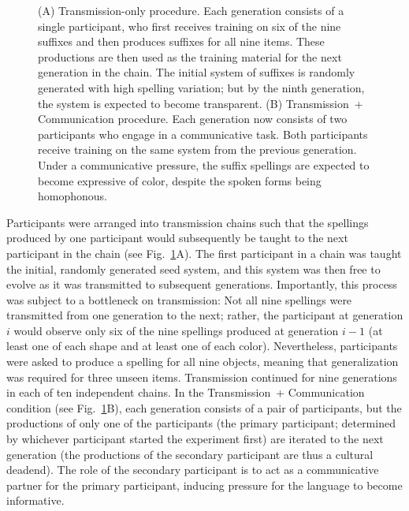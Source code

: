 \documentclass[doc,biblatex]{apa7}
\begin{document}
	\begin{figure}
	\vspace*{2pt}
	\caption{(A) Transmission-only procedure. Each generation consists of a single participant, who first receives training on six of the nine suffixes and then produces suffixes for all nine items. These productions are then used as the training material for the next generation in the chain. The initial system of suffixes is randomly generated with high spelling variation; but by the ninth generation, the system is expected to become transparent. (B) Transmission~+ Communication procedure. Each generation now consists of two participants who engage in a communicative task. Both participants receive training on the same system from the previous generation. Under a communicative pressure, the suffix spellings are expected to become expressive of color, despite the spoken forms being homophonous.}
	\label{transmission}
	\end{figure}

Participants were arranged into transmission chains such that the spellings produced by one participant would subsequently be taught to the next participant in the chain (see Fig.~\ref{transmission}A). The first participant in a chain was taught the initial, randomly generated seed system, and this system was then free to evolve as it was transmitted to subsequent generations. Importantly, this process was subject to a bottleneck on transmission: Not all nine spellings were transmitted from one generation to the next; rather, the participant at generation $i$ would observe only six of the nine spellings produced at generation $i-1$ (at least one of each shape and at least one of each color). Nevertheless, participants were asked to produce a spelling for all nine objects, meaning that generalization was required for three unseen items. Transmission continued for nine generations in each of ten independent chains. In the Transmission~+ Communication condition (see Fig.~\ref{transmission}B), each generation consists of a pair of participants, but the productions of only one of the participants (the primary participant; determined by whichever participant started the experiment first) are iterated to the next generation (the productions of the secondary participant are thus a cultural deadend). The role of the secondary participant is to act as a communicative partner for the primary participant, inducing pressure for the language to become informative.
\end{document}
